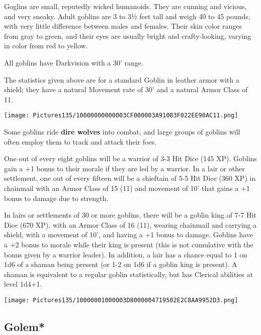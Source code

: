 \documentclass[a4paper,twoside,openany,10pt]{book}
\begin{document}
\begin{multicols}{2}
Goglins are small, reputedly wicked humanoids. They are cunning and vicious, and very sneaky. Adult goblins are 3 to 3½ feet tall and weigh 40 to 45 pounds, with very little difference between males and females. Their skin color ranges from gray to green, and their eyes are usually bright and crafty-looking, varying in color from red to yellow.

All goblins have Darkvision with a 30' range.

The statistics given above are for a standard Goblin in leather armor with a shield; they have a natural Movement rate of 30' and a natural Armor Class of 11.

\begin{center}
	\texttt{[image: Pictures135/10000000000003CF000003A91083F022EE90AC11.png]}
\end{center}

Some goblins ride \textbf{dire wolves} into combat, and large groups of goblins will often employ them to track and attack their foes.

One out of every eight goblins will be a warrior of 3-3 Hit Dice (145 XP). Goblins gain a +1 bonus to their morale if they are led by a warrior. In a lair or other settlement, one out of every fifteen will be a chieftain of 5-5 Hit Dice (360 XP) in chainmail with an Armor Class of 15 (11) and movement of 10' that gains a +1 bonus to damage due to strength. 


In lairs or settlements of 30 or more goblins, there will be a goblin king of 7-7 Hit Dice (670 XP), with an Armor Class of 16 (11), wearing chainmail and carrying a shield, with a movement of 10', and having a +1 bonus to damage. Goblins have a +2 bonus to morale while their king is present (this is not cumulative with the bonus given by a warrior leader). In addition, a lair has a chance equal to 1 on 1d6 of a shaman being present (or 1-2 on 1d6 if a goblin king is present). A shaman is equivalent to a regular goblin statistically, but has Clerical abilities at level 1d4+1.


\begin{center}
	\texttt{[image: Pictures135/10000001000003D8000004719502E2C8AA9952D3.png]}
\end{center}

\columnbreak


\subsection*{Golem*}\label{golem}


\end{multicols}
\end{document}
